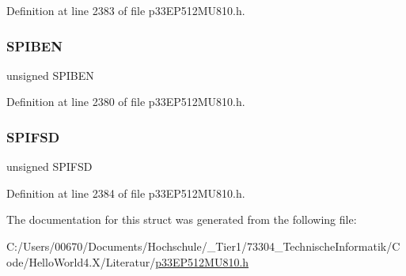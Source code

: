 Definition at line 2383 of file p33\+E\+P512\+M\+U810.\+h.

\mbox{\label{structtag_s_p_i4_c_o_n2_b_i_t_s_a48f1b49d7589da2ee8c38cd6d820a542}} 
\subsubsection{\texorpdfstring{S\+P\+I\+B\+EN}{SPIBEN}}
{\footnotesize\ttfamily unsigned S\+P\+I\+B\+EN}



Definition at line 2380 of file p33\+E\+P512\+M\+U810.\+h.

\mbox{\label{structtag_s_p_i4_c_o_n2_b_i_t_s_aeb3b552a9f7c25bc1ae09655904e34cc}} 
\subsubsection{\texorpdfstring{S\+P\+I\+F\+SD}{SPIFSD}}
{\footnotesize\ttfamily unsigned S\+P\+I\+F\+SD}



Definition at line 2384 of file p33\+E\+P512\+M\+U810.\+h.



The documentation for this struct was generated from the following file\+:\begin{DoxyCompactItemize}
\item 
C\+:/\+Users/00670/\+Documents/\+Hochschule/\+\_\+\+Tier1/73304\+\_\+\+Technische\+Informatik/\+Code/\+Hello\+World4.\+X/\+Literatur/\hyperlink{p33_e_p512_m_u810_8h}{p33\+E\+P512\+M\+U810.\+h}\end{DoxyCompactItemize}
